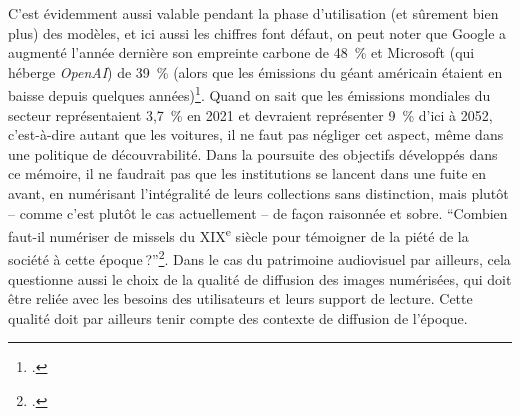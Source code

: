 C’est évidemment aussi valable pendant la phase d’utilisation (et sûrement bien plus) des modèles, et ici aussi les chiffres font défaut, on peut noter que Google a augmenté l’année dernière son empreinte carbone de 48 \% et Microsoft (qui héberge \textit{OpenAI}) de 39 \% (alors que les émissions du géant américain étaient en baisse depuis quelques années)\footcite{noauthor__nodate}. Quand on sait que les émissions mondiales du secteur représentaient 3,7 \% en 2021 et devraient représenter 9 \% d’ici à 2052, c’est-à-dire autant que les voitures, il ne faut pas négliger cet aspect, même dans une politique de découvrabilité. Dans la poursuite des objectifs développés dans ce mémoire, il ne faudrait pas que les institutions se lancent dans une fuite en avant, en numérisant l'intégralité de leurs collections sans distinction, mais plutôt -- comme c'est plutôt le cas actuellement -- de façon raisonnée et sobre. \enquote{Combien faut-il numériser de missels du XIX\textsuperscript{e} siècle pour témoigner de la piété de la société à cette époque ?}\footcite[p. 21]{bermes2024}. Dans le cas du patrimoine audiovisuel par ailleurs, cela questionne aussi le choix de la qualité de diffusion des images numérisées, qui doit être reliée avec les besoins des utilisateurs et leurs support de lecture. Cette qualité doit par ailleurs tenir compte des contexte de diffusion de l'époque.

